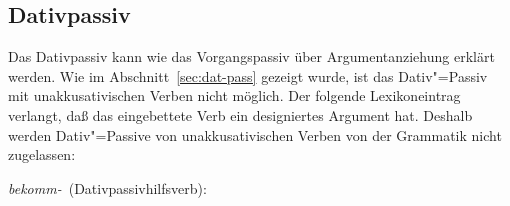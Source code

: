 


\subsection{Dativpassiv}
\label{sec-anal-dativpassiv}

Das
Dativpassiv kann wie das Vorgangspassiv %
über Argumentanziehung
erklärt werden. Wie im Abschnitt~\ref{sec:dat-pass} gezeigt wurde, ist das Dativ"=Passiv
mit unakkusativischen Verben nicht möglich. Der folgende Lexikoneintrag
verlangt, daß das eingebettete Verb ein designiertes Argument hat. Deshalb
werden Dativ"=Passive von unakkusativischen Verben von der Grammatik nicht zugelassen:

\eas
\label{le-bekommen-passive-da}
\mbox{\emph{bekomm-} (Dativpassivhilfsverb):} \\
\zs

